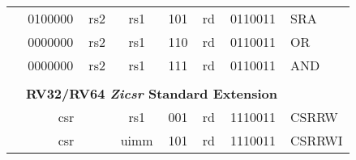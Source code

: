 \begin{table}[p]
\begin{small}
\begin{center}
\begin{tabular}{p{0in}p{0.4in}p{0.05in}p{0.05in}p{0.05in}p{0.05in}p{0.4in}p{0.6in}p{0.4in}p{0.6in}p{0.7in}l}
        &
        \multicolumn{4}{|c|}{0100000} &
        \multicolumn{2}{c|}{rs2} &
        \multicolumn{1}{c|}{rs1} &
        \multicolumn{1}{c|}{101} &
        \multicolumn{1}{c|}{rd} &
        \multicolumn{1}{c|}{0110011} & SRA \\
        \cline{2-11}

        &
        \multicolumn{4}{|c|}{0000000} &
        \multicolumn{2}{c|}{rs2} &
        \multicolumn{1}{c|}{rs1} &
        \multicolumn{1}{c|}{110} &
        \multicolumn{1}{c|}{rd} &
        \multicolumn{1}{c|}{0110011} & OR \\
        \cline{2-11}

        &
        \multicolumn{4}{|c|}{0000000} &
        \multicolumn{2}{c|}{rs2} &
        \multicolumn{1}{c|}{rs1} &
        \multicolumn{1}{c|}{111} &
        \multicolumn{1}{c|}{rd} &
        \multicolumn{1}{c|}{0110011} & AND \\
        \cline{2-11}

        &
        \multicolumn{10}{c}{} & \\
        &
        \multicolumn{10}{c}{\bf RV32/RV64 \emph{Zicsr} Standard Extension} & \\
        \cline{2-11}

        &
        \multicolumn{6}{|c|}{csr} &
        \multicolumn{1}{c|}{rs1} &
        \multicolumn{1}{c|}{001} &
        \multicolumn{1}{c|}{rd} &
        \multicolumn{1}{c|}{1110011} & CSRRW \\
        \cline{2-11}

        &
        \multicolumn{6}{|c|}{csr} &
        \multicolumn{1}{c|}{uimm} &
        \multicolumn{1}{c|}{101} &
        \multicolumn{1}{c|}{rd} &
        \multicolumn{1}{c|}{1110011} & CSRRWI \\
        \cline{2-11}

      \end{tabular}
    \end{center}
  \end{small}

  \end{table}
